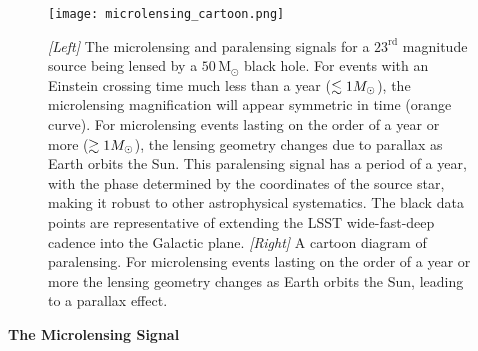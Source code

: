 \begin{figure}
\centering
\texttt{[image: microlensing\_cartoon.png]}
\caption{\label{fig:microlensing_cartoon}
    \emph{[Left]} 
        The microlensing and paralensing signals for a $23^\mathrm{rd}$ magnitude source being lensed by a $50\,\mathrm{M}_\odot$ black hole. 
        For events with an Einstein crossing time much less than a year ($\lesssim 1 M_\odot$), the microlensing magnification will appear symmetric in time (orange curve).
        For microlensing events lasting on the order of a year or more ($\gtrsim 1 M_\odot$), the lensing geometry changes due to parallax as Earth orbits the Sun.
        This paralensing signal has a period of a year, with the phase determined by the coordinates of the source star, making it robust to other astrophysical systematics.
        The black data points are representative of extending the LSST wide-fast-deep cadence into the Galactic plane. 
        \emph{[Right]} 
        A cartoon diagram of paralensing. 
        For microlensing events lasting on the order of a year or more the lensing geometry changes as Earth orbits the Sun, leading to a parallax effect.
    }
\end{figure}

\noindent \textbf{The Microlensing Signal}

